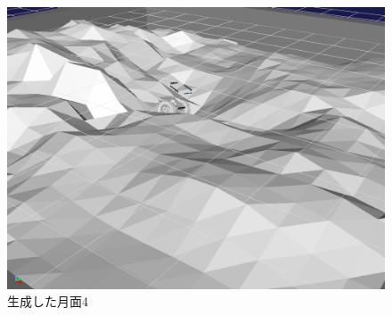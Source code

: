  \begin{figure}[htbp]
  \begin{center}
   \includegraphics[width=0.6\linewidth]{images/generate_field4.png}
   \caption{生成した月面4}
   \label{fig:generate_field4}
  \end{center}
 \end{figure}


